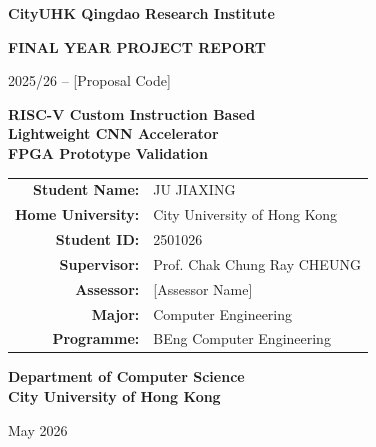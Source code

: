 \documentclass[12pt,a4paper,twoside]{report}
\newcommand{\projectcode}{[Proposal Code]}
\newcommand{\studentname}{JU JIAXING}
\newcommand{\homeuniversity}{City University of Hong Kong}
\newcommand{\studentid}{2501026}
\newcommand{\supervisor}{Prof. Chak Chung Ray CHEUNG}
\newcommand{\assessor}{[Assessor Name]}
\newcommand{\major}{Computer Engineering}
\newcommand{\programme}{BEng Computer Engineering}
\begin{document}
\begin{titlepage}
\thispagestyle{empty}
\begin{center}

\vspace*{1cm}

{\large\textbf{CityUHK Qingdao Research Institute}}

\vspace{0.8cm}

{\Large\textbf{FINAL YEAR PROJECT REPORT}}

\vspace{0.5cm}

{\large 2025/26 -- \projectcode}

\vspace{1.5cm}

{\Huge\textbf{RISC-V Custom Instruction Based \\[0.3cm] Lightweight CNN Accelerator \\[0.3cm] FPGA Prototype Validation}}

\vspace{2cm}

\begin{tabular}{rl}
\textbf{Student Name:} & \studentname \\
\textbf{Home University:} & \homeuniversity \\
\textbf{Student ID:} & \studentid \\
\textbf{Supervisor:} & \supervisor \\
\textbf{Assessor:} & \assessor \\
\textbf{Major:} & \major \\
\textbf{Programme:} & \programme \\
\end{tabular}

\vspace{2cm}

{\large\textbf{Department of Computer Science}\\[0.3cm]
\large\textbf{City University of Hong Kong}}

\vfill

{\large May 2026}

\end{center}
\end{titlepage}

\end{document}
